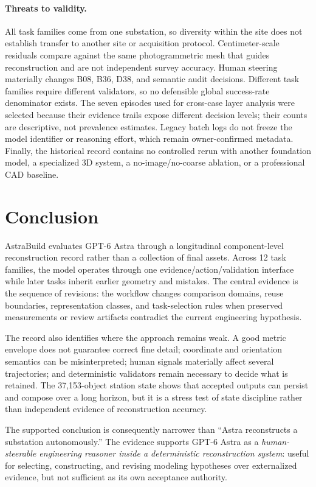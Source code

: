 \documentclass[10pt]{article}
\begin{document}
\paragraph{Threats to validity.}
All task families come from one substation, so diversity within the site does not establish transfer to another site or acquisition protocol. Centimeter-scale residuals compare against the same photogrammetric mesh that guides reconstruction and are not independent survey accuracy. Human steering materially changes B08, B36, D38, and semantic audit decisions. Different task families require different validators, so no defensible global success-rate denominator exists. The seven episodes used for cross-case layer analysis were selected because their evidence trails expose different decision levels; their counts are descriptive, not prevalence estimates. Legacy batch logs do not freeze the model identifier or reasoning effort, which remain owner-confirmed metadata. Finally, the historical record contains no controlled rerun with another foundation model, a specialized 3D system, a no-image/no-coarse ablation, or a professional CAD baseline.

\section{Conclusion}
AstraBuild evaluates GPT-6 Astra through a longitudinal component-level reconstruction record rather than a collection of final assets. Across 12 task families, the model operates through one evidence/action/validation interface while later tasks inherit earlier geometry and mistakes. The central evidence is the sequence of revisions: the workflow changes comparison domains, reuse boundaries, representation classes, and task-selection rules when preserved measurements or review artifacts contradict the current engineering hypothesis.

The record also identifies where the approach remains weak. A good metric envelope does not guarantee correct fine detail; coordinate and orientation semantics can be misinterpreted; human signals materially affect several trajectories; and deterministic validators remain necessary to decide what is retained. The 37,153-object station state shows that accepted outputs can persist and compose over a long horizon, but it is a stress test of state discipline rather than independent evidence of reconstruction accuracy.

The supported conclusion is consequently narrower than ``Astra reconstructs a substation autonomously.'' The evidence supports GPT-6 Astra as a \emph{human-steerable engineering reasoner inside a deterministic reconstruction system}: useful for selecting, constructing, and revising modeling hypotheses over externalized evidence, but not sufficient as its own acceptance authority.
\end{document}
